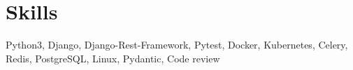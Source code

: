 \section{Skills}
Python3, Django, Django-Rest-Framework, Pytest, Docker, Kubernetes, Celery, Redis, PostgreSQL, Linux, Pydantic, Code review
